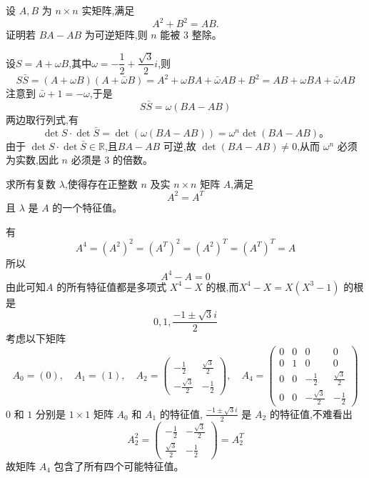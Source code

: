 \begin{questions}
    \question 设 $A,B$ 为 $n\times n$ 实矩阵,满足
    \[
    A^2+B^2=AB.
    \]
    证明若 $BA-AB$ 为可逆矩阵,则 $n$ 能被 $3$ 整除。
    \begin{solution}
        设$S=A+\omega B$,其中$\omega=-\dfrac12+\dfrac{\sqrt3}{2}i$,则
        \[
        S\bar S=(A+\omega B)(A+\bar\omega B) =A^2+\omega BA+\bar\omega AB+B^2=AB+\omega BA+\bar\omega AB
        \]
        注意到 $\bar\omega+1=-\omega$,于是
        \[
        S\bar S=\omega(BA-AB)
        \]
        两边取行列式,有
        \[
        \det S\cdot\det\bar S=\det(\omega(BA-AB))=\omega^n\det(BA-AB)。
        \]
        由于 $\det S\cdot\det\bar S \in \mathbb{R}$,且$BA-AB$ 可逆,故 $\det(BA-AB)\ne0$,从而 $\omega^n$ 必须为实数,因此 $n$ 必须是 $3$ 的倍数。
    \end{solution}

    \question 求所有复数 $\lambda$,使得存在正整数 $n$ 及实 $n \times n$ 矩阵 $A$,满足 
    \[
    A^2 = A^T
    \]
    且 $\lambda$ 是 $A$ 的一个特征值。
    \begin{solution}
        有
        \[ 
        A^4 = (A^2)^2 = (A^T)^2 = (A^2)^T = (A^T)^T = A
        \]
        所以
        \[ 
        A^4 - A = 0
        \]
        由此可知$A$ 的所有特征值都是多项式 $X^4 - X$ 的根,而$X^4 - X = X(X^3 - 1)$ 的根是 
        \[
        0, 1,\frac{-1 \pm \sqrt{3}i}{2}
        \]
        考虑以下矩阵
        \[ 
        A_0 = (0) , \quad A_1 = (1) , \quad A_2 = \begin{pmatrix} -\frac{1}{2} & \frac{\sqrt{3}}{2} \\ -\frac{\sqrt{3}}{2} & -\frac{1}{2} \end{pmatrix} , \quad A_4 = \begin{pmatrix} 0 & 0 & 0 & 0 \\ 0 & 1 & 0 & 0 \\ 0 & 0 & -\frac{1}{2} & \frac{\sqrt{3}}{2} \\ 0 & 0 & -\frac{\sqrt{3}}{2} & -\frac{1}{2} \end{pmatrix} 
        \]
        $0$ 和 $1$ 分别是 $1 \times 1$ 矩阵 $A_0$ 和 $A_1$ 的特征值, $\frac{-1 \pm \sqrt{3}i}{2}$ 是 $A_2$ 的特征值,不难看出
        \[ 
        A_2^2 = \begin{pmatrix} -\frac{1}{2} & -\frac{\sqrt{3}}{2} \\ \frac{\sqrt{3}}{2} & -\frac{1}{2} \end{pmatrix} = A_2^T
        \]
        故矩阵 $A_4$ 包含了所有四个可能特征值。
    \end{solution}


\end{questions}
